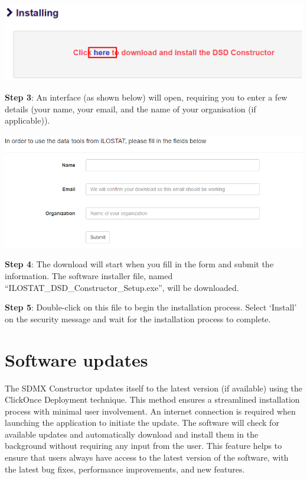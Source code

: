 \documentclass[
]{book}
\begin{document}
\begin{center}\includegraphics[width=1\linewidth]{./images/image005} \end{center}

\textbf{Step 3}: An interface (as shown below) will open, requiring you to enter a few details (your name, your email, and the name of your organisation (if applicable)).

\begin{center}\includegraphics[width=1\linewidth]{./images/image007} \end{center}

\textbf{Step 4}: The download will start when you fill in the form and submit the information. The software installer file, named ``ILOSTAT\_DSD\_Constructor\_Setup.exe'', will be downloaded.

\textbf{Step 5}: Double-click on this file to begin the installation process. Select `Install' on the security message and wait for the installation process to complete.

\hypertarget{software-updates}{%
\section{Software updates}\label{software-updates}}

The SDMX Constructor updates itself to the latest version (if available) using the ClickOnce Deployment technique. This method ensures a streamlined installation process with minimal user involvement. An internet connection is required when launching the application to initiate the update. The software will check for available updates and automatically download and install them in the background without requiring any input from the user. This feature helps to ensure that users always have access to the latest version of the software, with the latest bug fixes, performance improvements, and new features.
\end{document}
